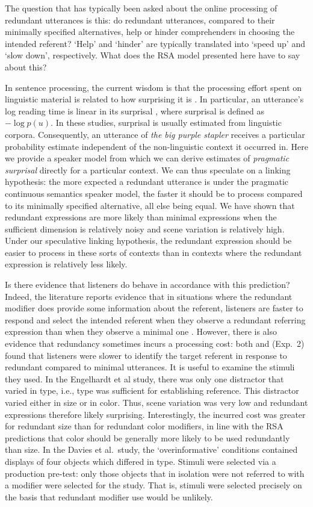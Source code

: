 \documentclass[11pt]{article}
\begin{document}
The question that has typically been asked about the online processing of redundant utterances is this: do redundant utterances, compared to their minimally specified alternatives, help or hinder comprehenders in choosing the intended referent? `Help' and `hinder' are typically translated into `speed up' and `slow down', respectively. What does the RSA model presented here have to say about this? 

In sentence processing, the current wisdom is that the processing effort spent on linguistic material is related to how surprising it is \cite{Hale2001,Levy2008}. In particular, an utterance's log reading time is linear in its surprisal \cite{Smith2013}, where surprisal is defined as $-\log p(u)$. In these studies, surprisal is usually estimated from linguistic corpora. Consequently, an utterance of \emph{the big purple stapler} receives a particular probability estimate independent of the non-linguistic context it occurred in. Here we provide a speaker model from which we can derive estimates of \emph{pragmatic surprisal} directly for a particular context. We can thus speculate on a linking hypothesis: the more expected a redundant utterance is under the pragmatic continuous semantics speaker model, the faster it should be to process compared to its minimally specified alternative, all else being equal. We have shown that redundant expressions are more likely than minimal expressions when the sufficient dimension is relatively noisy and scene variation is relatively high. Under our speculative linking hypothesis, the redundant expression should be easier to process in these sorts of contexts  than in contexts where the redundant expression is relatively less likely. 

Is there evidence that listeners do behave in accordance with this prediction? Indeed, the literature reports evidence that in situations where the redundant modifier does provide some information about the referent, listeners are faster to respond and select the intended referent when they observe a redundant referring expression than when they observe a minimal one \cite{Arts2011,  Paraboni2007}. However, there is also evidence that redundancy sometimes incurs a processing cost: both  and  (Exp.~2) found that listeners were slower to identify the target referent in response to redundant compared to minimal utterances. It is useful to examine the stimuli they used. In the Engelhardt et al study, there was only one distractor that varied in type, i.e., type was sufficient for establishing reference. This distractor varied either in size or in color. Thus, scene variation was very low and redundant expressions therefore likely surprising. Interestingly, the incurred cost was greater for redundant size than for redundant color modifiers, in line with the RSA predictions that color should be generally more likely to be used redundantly than size. In the Davies et al.~study, the `overinformative' conditions contained displays of four objects which differed in type. Stimuli were selected via a production pre-test: only those objects that in isolation were not referred to with a modifier were selected for the study. That is, stimuli were selected precisely on the basis that redundant modifier use would be unlikely.
\end{document}
